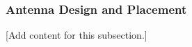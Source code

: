
\subsubsection{Antenna Design and Placement}
\label{subsubsec:design_2_3_3_antenna_design_placement}

[Add content for this subsection.]
